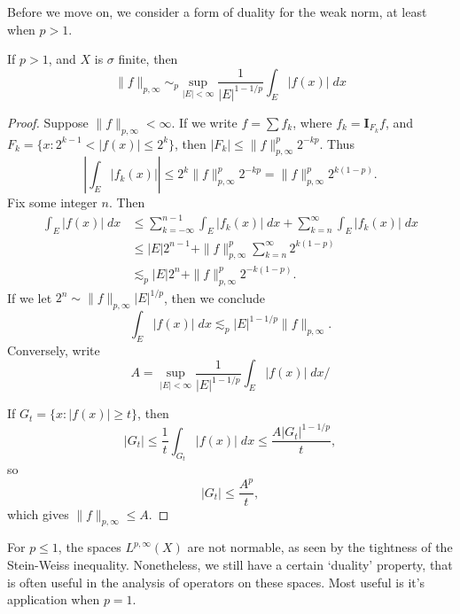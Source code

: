 Before we move on, we consider a form of duality for the weak norm, at least when $p > 1$.

\begin{theorem}
	If $p > 1$, and $X$ is $\sigma$ finite, then
	\[ \| f \|_{p,\infty} \sim_p \sup_{|E| < \infty} \frac{1}{|E|^{1-1/p}} \int_E |f(x)|\; dx \]
\end{theorem}
\begin{proof}
	Suppose $\| f \|_{p,\infty} < \infty$. If we write $f = \sum f_k$, where $f_k = \mathbf{I}_{F_k} f$, and $F_k = \{ x: 2^{k-1} < |f(x)| \leq 2^k \}$, then $|F_k| \leq \| f \|_{p,\infty}^p 2^{-kp}$. Thus
	\[ \left| \int_E |f_k(x)| \right| \leq 2^k \| f \|_{p,\infty}^p 2^{-kp} = \| f \|_{p,\infty}^p 2^{k(1-p)}. \]
	Fix some integer $n$. Then
	\begin{align*}
		\int_E |f(x)|\; dx &\leq \sum_{k = -\infty}^{n-1} \int_E |f_k(x)|\; dx + \sum_{k = n}^\infty \int_E |f_k(x)|\; dx\\
		&\leq |E| 2^{n-1} + \| f \|_{p,\infty}^p \sum_{k = n}^\infty 2^{k(1-p)}\\
		&\lesssim_p |E| 2^n + \| f \|_{p,\infty}^p 2^{-k(1-p)}.
	\end{align*}
	If we let $2^n \sim \| f \|_{p,\infty} |E|^{1/p}$, then we conclude
	\[ \int_E |f(x)|\; dx \lesssim_p |E|^{1 - 1/p} \| f \|_{p,\infty}. \]
	Conversely, write 
	\[ A = \sup_{|E| < \infty} \frac{1}{|E|^{1-1/p}} \int_E |f(x)|\; dx/ \]

	If $G_t = \{ x: |f(x)| \geq t \}$, then
	\[ |G_t| \leq \frac{1}{t} \int_{G_t} |f(x)|\; dx \leq \frac{A |G_t|^{1 - 1/p}}{t}, \]
	so
	\[ |G_t| \leq \frac{A^p}{t}, \]
	which gives $\| f \|_{p,\infty} \leq A$.
\end{proof}

For $p \leq 1$, the spaces $L^{p,\infty}(X)$ are not normable, as seen by the tightness of the Stein-Weiss inequality. Nonetheless, we still have a certain `duality' property, that is often useful in the analysis of operators on these spaces. Most useful is it's application when $p = 1$.

